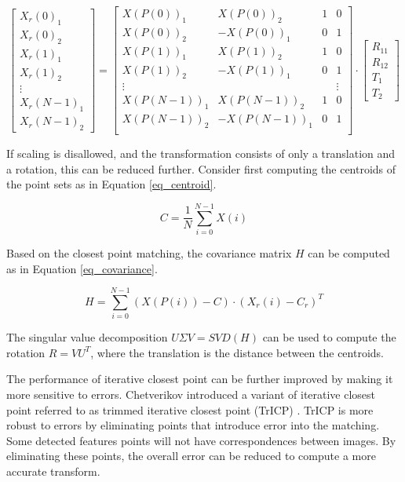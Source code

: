 \documentclass[sigconf]{acmart}
\begin{document}
\begin{equation}
\begin{bmatrix}
X_r(0)_1 \\
X_r(0)_2 \\
X_r(1)_1 \\
X_r(1)_2 \\
\vdots \\
X_r(N-1)_1 \\
X_r(N-1)_2
\end{bmatrix}
=
\begin{bmatrix}
X(P(0))_1 & X(P(0))_2 & 1 & 0 \\
X(P(0))_2 & -X(P(0))_1 & 0 & 1 \\
X(P(1))_1 & X(P(1))_2 & 1 & 0 \\
X(P(1))_2 & -X(P(1))_1 & 0 & 1 \\
\vdots & & & \vdots \\
X(P(N-1))_1 & X(P(N-1))_2 & 1 & 0 \\
X(P(N-1))_2 & -X(P(N-1))_1 & 0 & 1 \\
\end{bmatrix}
\cdot
\begin{bmatrix}
R_{11} \\
R_{12} \\
T_1 \\
T_2
\end{bmatrix}
\label{eq_reduced_icp_matrix}
\end{equation}

If scaling is disallowed, and the transformation consists of only a translation and a rotation, this can be reduced further. Consider first computing the centroids of the point sets as in Equation \ref{eq_centroid}.

\begin{equation}
C = \frac{1}{N}\sum\limits_{i=0}^{N-1}X(i)
\label{eq_centroid}
\end{equation}

Based on the closest point matching, the covariance matrix $H$ can be computed as in Equation \ref{eq_covariance}.

\begin{equation}
H=\sum\limits_{i=0}^{N-1} (X(P(i)) - C) \cdot (X_r(i) - C_r)^T
\label{eq_covariance}
\end{equation}

The singular value decomposition $U\Sigma V = SVD(H)$ can be used to compute the rotation $R=VU^T$, where the translation is the distance between the centroids.

The performance of iterative closest point can be further improved by making it more sensitive to errors. Chetverikov introduced a variant of iterative closest point referred to as trimmed iterative closest point (TrICP) \cite{chetverikov_trimmed_2002}. TrICP is more robust to errors by eliminating points that introduce error into the matching. Some detected features points will not have correspondences between images. By eliminating these points, the overall error can be reduced to compute a more accurate transform.
\end{document}
